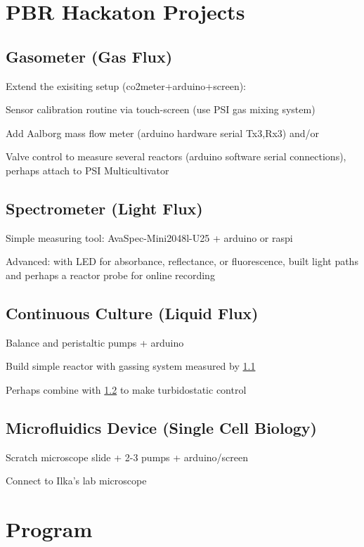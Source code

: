 \documentclass[12pt,a4paper]{article}
\begin{document}
\section{PBR Hackaton Projects}
\label{proj}

\subsection{Gasometer (Gas Flux)}
\label{gas}

Extend the exisiting setup (co2meter+arduino+screen): 

Sensor calibration routine via touch-screen (use PSI gas mixing system) 

Add Aalborg mass flow meter (arduino hardware serial Tx3,Rx3) and/or 

Valve control to measure several reactors (arduino software serial
connections), perhaps attach to PSI Multicultivator

\subsection{Spectrometer (Light Flux)} 
\label{spec}

Simple measuring tool: AvaSpec-Mini2048l-U25 + arduino or raspi

Advanced: with LED for absorbance, reflectance, or fluorescence,
built light paths and perhaps a reactor probe for online recording

\subsection{Continuous Culture (Liquid Flux)} 
\label{cult}

Balance and peristaltic pumps + arduino

Build simple reactor with gassing system measured by \ref{gas}

Perhaps combine with \ref{spec} to make turbidostatic control

\subsection{Microfluidics Device (Single Cell Biology)} 
\label{micro}

Scratch microscope slide + 2-3 pumps + arduino/screen

Connect to Ilka's lab microscope


\newpage

\section{Program}
\end{document}

